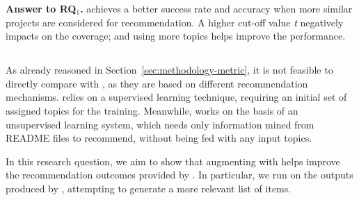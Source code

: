 


\begin{tcolorbox}[boxrule=0.86pt,left=0.3em, right=0.3em,top=0.1em, bottom=0.05em]
\textbf{Answer to RQ$_1$.} \TFa achieves a better success rate and accuracy 
when more similar projects are considered for recommendation.
A higher cut-off value \emph{t} negatively impacts on the coverage; and using more topics helps improve the performance.
\end{tcolorbox}


%

\subsection{\rqsecond} \label{sec:EXP3}

As already reasoned in Section~\ref{sec:methodology-metric}, it is not feasible to directly compare \TF with \MNB, as they are based on different recommendation mechanisms. \TF relies on a supervised learning technique, requiring an initial set of assigned topics for the training. Meanwhile, \MNB works on the basis of an unsupervised learning system, which needs only information mined from README files to recommend, without being fed with any input topics.

In this research question, we aim to show that augmenting \MNB with \TF helps improve the recommendation outcomes provided by \MNB. In particular, we run \TF on the outputs produced by \MNB, attempting to generate a more relevant list of items. %


